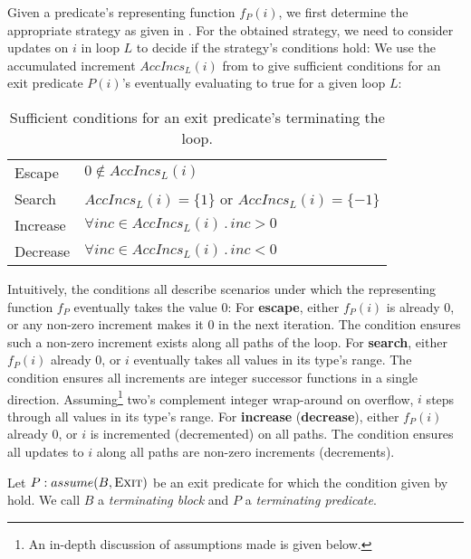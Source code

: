 Given a predicate's representing function $f_P(i)$, we first determine the appropriate strategy as given in . For the obtained strategy, we need to consider updates on $i$ in loop $L$ to decide if the strategy's conditions hold: We use the accumulated increment $AccIncs_L(i)$ from  to give sufficient conditions for an exit predicate $P(i)$'s eventually evaluating to true for a given loop $L$:

\begin{table}
\begin{tabular}{ll}
    Escape   & $0 \not\in AccIncs_L(i)$ \\
    Search   & $AccIncs_L(i) = \{ 1 \}$ or $AccIncs_L(i) = \{ -1 \}$              \\
    Increase & $\forall inc \in AccIncs_L(i) \,.\, inc > 0$                          \\
    Decrease & $\forall inc \in AccIncs_L(i) \,.\, inc < 0$                          \\
\end{tabular}
\caption{Sufficient conditions for an exit predicate's terminating the loop.}
\label{tab:termpred}
\end{table}

Intuitively, the conditions all describe scenarios under which the representing function $f_P$ eventually takes the value 0: For \textbf{escape}, either $f_P(i)$ is already 0, or any non-zero increment makes it 0 in the next iteration. The condition ensures such a non-zero increment exists along all paths of the loop. For \textbf{search}, either $f_P(i)$ already 0, or $i$ eventually takes all values in its type's range. The condition ensures all increments are integer successor functions in a single direction. Assuming\footnote{An in-depth discussion of assumptions made is given below.} two's complement integer wrap-around on overflow, $i$ steps through all values in its type's range. For \textbf{increase} (\textbf{decrease}), either $f_P(i)$ already 0, or $i$ is incremented (decremented) on all paths. The condition ensures all updates to $i$ along all paths are non-zero increments (decrements).

\begin{definition}
    Let $P: assume(B, \textsc{Exit})$ be an exit predicate for which the condition given by  hold. We call $B$ a \emph{terminating block} and $P$ a \emph{terminating predicate}.
    \label{def:tpred}
\end{definition}


